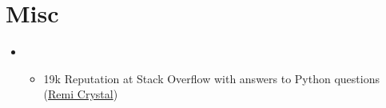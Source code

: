 \documentclass[letterpaper,11pt]{article}
\newcommand{\resumeItem}[1]{
  \item\small{
    {#1 \vspace{-2pt}}
  }
}
\newcommand{\resumeItemListStart}{\begin{itemize}}
\newcommand{\resumeItemListEnd}{\end{itemize}\vspace{-5pt}}
\begin{document}
%
\section{Misc}
 \begin{itemize}[leftmargin=0.15in, label={}]
   \item{
    \resumeItemListStart
      \resumeItem{19k Reputation at Stack Overflow with answers to Python questions (\href{https://stackoverflow.com/users/5299236}{Remi Crystal})}
    \resumeItemListEnd
    }
 \end{itemize}


\end{document}
